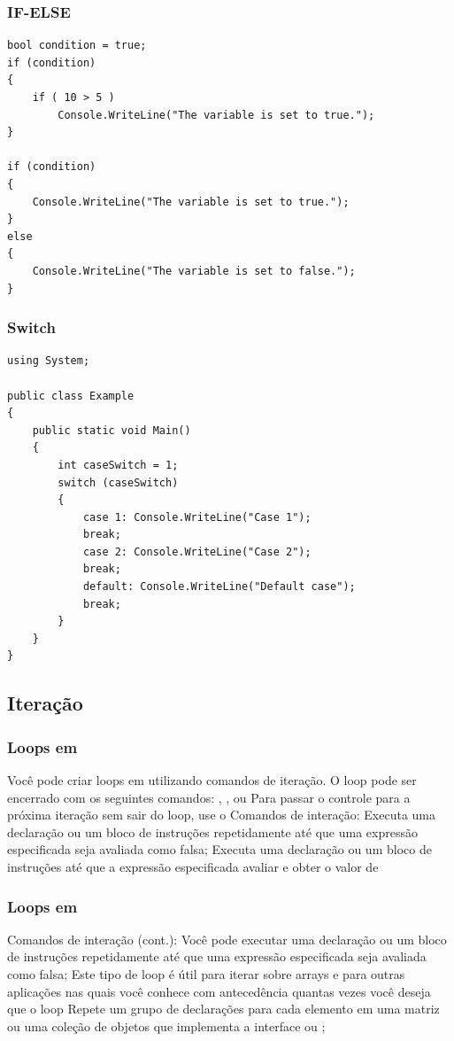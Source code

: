 \documentclass{beamer}
\begin{document}
\begin{frame}[fragile]
\frametitle{IF-ELSE}
\begin{lstlisting}
bool condition = true;
if (condition)
{
	if ( 10 > 5 )
		Console.WriteLine("The variable is set to true.");
}

if (condition)
{
	Console.WriteLine("The variable is set to true.");
}
else
{
	Console.WriteLine("The variable is set to false.");
}
\end{lstlisting}
\end{frame}


\begin{frame}[fragile]
\frametitle{Switch}
\begin{lstlisting}
using System;

public class Example
{
	public static void Main()
	{
		int caseSwitch = 1;		
		switch (caseSwitch)
		{
			case 1: Console.WriteLine("Case 1");
			break;
			case 2: Console.WriteLine("Case 2");
			break;
			default: Console.WriteLine("Default case");
			break;
		}
	}
}
\end{lstlisting}
\end{frame}

\subsection{Iteração}

\begin{frame}
\frametitle{Loops em \CS}
\begin{outline}
	\1 Você pode criar loops em \CS utilizando comandos de iteração.
	\1 O loop pode ser encerrado com os seguintes comandos: , ,  ou  
	\1 Para passar o controle para a próxima iteração sem sair do loop, use o 
	\1 Comandos de interação:
	\2 [\textbf{do}] Executa uma declaração ou um bloco de instruções repetidamente até que uma expressão especificada seja avaliada como falsa;
	 Executa uma declaração ou um bloco de instruções até que a expressão especificada avaliar e obter o valor de 
\end{outline}
\end{frame}


\begin{frame}
\frametitle{Loops em \CS}
\begin{outline}
	\1 Comandos de interação (cont.):
 	 Você pode executar uma declaração ou um bloco de instruções repetidamente até que uma expressão especificada seja avaliada como falsa;
	\3 Este tipo de loop é útil para iterar sobre arrays e para outras aplicações nas quais você conhece com antecedência quantas vezes você deseja que o loop
	 Repete um grupo de declarações para cada elemento em uma matriz ou uma coleção de objetos que implementa a interface  ou ;

\end{outline}
\end{frame}
\end{document}
